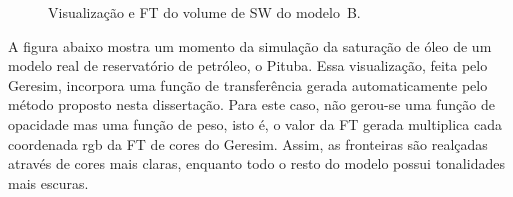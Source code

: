 \begin{figure}[h]
	\centering
	\caption{Visualização e FT do volume de SW do modelo~B.}
	\label{fig:r_box_sw}
\end{figure}

\clearpage
	A figura abaixo mostra um momento da simulação da saturação de óleo de um modelo real de reservatório de petróleo, o Pituba. Essa visualização, feita pelo Geresim, incorpora uma função de transferência gerada automaticamente pelo método proposto nesta dissertação. Para este caso, não gerou-se uma função de opacidade mas uma função de peso, isto é, o valor da FT gerada multiplica cada coordenada rgb da FT de cores do Geresim. Assim, as fronteiras são realçadas através de cores mais claras, enquanto todo o resto do modelo possui tonalidades mais escuras.
	
